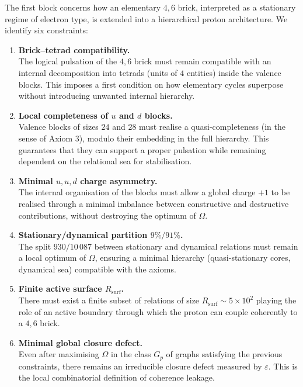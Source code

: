 \documentclass[11pt,a4paper]{article}
\begin{document}
The first block concerns how an elementary $4,6$ brick, interpreted as a
stationary regime of electron type, is extended into a hierarchical proton
architecture. We identify six constraints:

\begin{enumerate}
  \item \textbf{Brick--tetrad compatibility.} \\
  The logical pulsation of the $4,6$ brick must remain compatible with an
  internal decomposition into tetrads (units of $4$ entities) inside the
  valence blocks. This imposes a first condition on how elementary cycles
  superpose without introducing unwanted internal hierarchy.

  \item \textbf{Local completeness of $u$ and $d$ blocks.} \\
  Valence blocks of sizes $24$ and $28$ must realise a quasi-completeness
  (in the sense of Axiom 3), modulo their embedding in the full hierarchy.
  This guarantees that they can support a proper pulsation while remaining
  dependent on the relational sea for stabilisation.

  \item \textbf{Minimal $u,u,d$ charge asymmetry.} \\
  The internal organisation of the blocks must allow a global charge $+1$
  to be realised through a minimal imbalance between constructive and
  destructive contributions, without destroying the optimum of $\Omega$.

  \item \textbf{Stationary/dynamical partition $9\%/91\%$.} \\
  The split $930/10\,087$ between stationary and dynamical relations must
  remain a local optimum of $\Omega$, ensuring a minimal hierarchy
  (quasi-stationary cores, dynamical sea) compatible with the axioms.

  \item \textbf{Finite active surface $R_{\text{surf}}$.} \\
  There must exist a finite subset of relations of size
  $R_{\text{surf}} \sim 5 \times 10^2$ playing the role of an active boundary
  through which the proton can couple coherently to a $4,6$ brick.

  \item \textbf{Minimal global closure defect.} \\
  Even after maximising $\Omega$ in the class $G_p$ of graphs satisfying the
  previous constraints, there remains an irreducible closure defect measured
  by $\varepsilon$. This is the local combinatorial definition of coherence
  leakage.
\end{enumerate}
\end{document}

